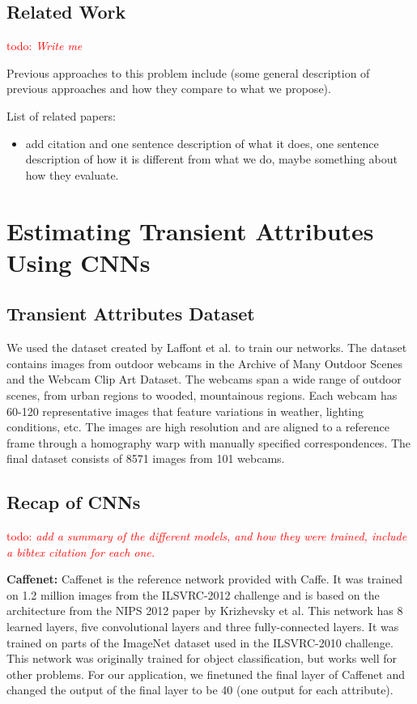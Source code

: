 \documentclass{article}
\newcommand{\todo}[1]{\textcolor{red}{todo: {\em #1}}}
\begin{document}
\subsection{Related Work}

\todo{Write me}

Previous approaches to this problem include (some general description
of previous approaches and how they compare to what we propose).

List of related papers:
\begin{itemize}

  \item add citation and one sentence description of what it does, one
    sentence description of how it is different from what we do, maybe
    something about how they evaluate.

\end{itemize}

\section{Estimating Transient Attributes Using CNNs}

\subsection{Transient Attributes Dataset}
\indent

We used the dataset created by Laffont\cite{Laffont14} et al. to train our 
networks. The dataset contains images from outdoor webcams in the  
Archive of Many Outdoor Scenes\cite{jacobs07amos} and the Webcam Clip Art 
Dataset\cite{lalondesig09}.  The webcams span a wide range of outdoor scenes,
from urban regions to wooded, mountainous regions. Each webcam has 60-120 
representative images that feature variations in weather, lighting conditions, 
etc.  The images are high resolution and are aligned to a reference frame 
through a homography warp with manually specified correspondences.  The final
dataset consists of 8571 images from 101 webcams.

\subsection{Recap of CNNs}

\todo{add a summary of the different models, and how they were
trained, include a bibtex citation for each one.}

\textbf{Caffenet:} Caffenet is the reference network provided with 
Caffe\cite{caffe14}.  It was trained on 1.2 million images from the 
ILSVRC-2012\cite{ILSVRCarxiv14} challenge and is based on the architecture from 
the NIPS 2012 paper by Krizhevsky\cite{caffenetnips12} et al.  This network has 
8 learned layers, five convolutional layers and three fully-connected layers.  
It was trained on parts of the ImageNet dataset used in the 
ILSVRC-2010\cite{ILSVRCarxiv14} challenge.  This network was originally trained 
for object classification, but works well for other problems. For our application, 
we finetuned the final layer of Caffenet and changed the output of the final 
layer to be 40 (one output for each attribute).
\end{document}
